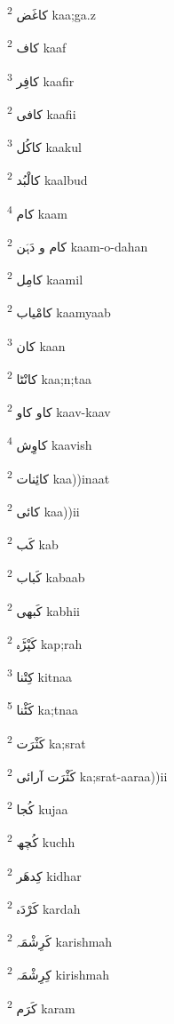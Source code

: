 \documentclass[12pt]{article}
\begin{document}
\begin{multicols}{5}
{\ur کاغَض}   \textsuperscript{2} kaa;ga.z

{\ur کاف}   \textsuperscript{2} kaaf

{\ur کافِر}   \textsuperscript{3} kaafir

{\ur کافی}   \textsuperscript{2} kaafii

{\ur کاکُل}   \textsuperscript{3} kaakul

{\ur کالْبُد}   \textsuperscript{2} kaalbud

{\ur کام}   \textsuperscript{4} kaam

{\ur کام و دَہَن}   \textsuperscript{2} kaam-o-dahan

{\ur کامِل}   \textsuperscript{2} kaamil

{\ur کامْیاب}   \textsuperscript{2} kaamyaab

{\ur کان}   \textsuperscript{3} kaan

{\ur کانْٹا}   \textsuperscript{2} kaa;n;taa

{\ur کاو کاو}   \textsuperscript{2} kaav-kaav

{\ur کاوِش}   \textsuperscript{4} kaavish

{\ur کائِنات}   \textsuperscript{2} kaa))inaat

{\ur کائی}   \textsuperscript{2} kaa))ii

{\ur کَب}   \textsuperscript{2} kab

{\ur کَباب}   \textsuperscript{2} kabaab

{\ur کَبھی}   \textsuperscript{2} kabhii

{\ur کَپْڑَہ}   \textsuperscript{2} kap;rah

{\ur کِتْنا}   \textsuperscript{3} kitnaa

{\ur کَٹْنا}   \textsuperscript{5} ka;tnaa

{\ur کَثْرَت}   \textsuperscript{2} ka;srat

{\ur کَثْرَت آرائی}   \textsuperscript{2} ka;srat-aaraa))ii

{\ur کُجا}   \textsuperscript{2} kujaa

{\ur کُچھ}   \textsuperscript{2} kuchh

{\ur کِدھَر}   \textsuperscript{2} kidhar

{\ur کَرْدَہ}   \textsuperscript{2} kardah

{\ur کَرِشْمَہ}   \textsuperscript{2} karishmah

{\ur کِرِشْمَہ}   \textsuperscript{2} kirishmah

{\ur کَرَم}   \textsuperscript{2} karam


\end{multicols}
\end{document}

